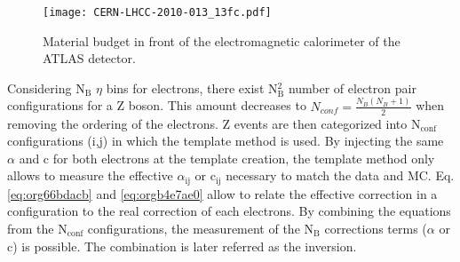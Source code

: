 \begin{figure}[htbp]
\centering
\texttt{[image: CERN-LHCC-2010-013\_13fc.pdf]}
\caption{\label{fig:org37061bb}
Material budget in front of the electromagnetic calorimeter of the ATLAS detector.\cite{CERN-LHCC-2010-013}}
\end{figure}


\begin{table}
\caption{Absolute values of $\eta_{calo}$ bin edges for energy scale factors (black and brown) and resolution constant terms (brown) for run~2.}
\label{tab:Calibration_inSitu_binning}
\end{table}


Considering N\(_{\text{B}}\) $\eta$ bins for electrons, there exist N\(_{\text{B}}^{\text{2}}\) number of electron pair configurations for a Z boson.
This amount decreases to \(N_{conf}=\frac{N_B(N_B+1)}{2}\) when removing the ordering of the electrons.
Z events are then categorized into  N\(_{\text{conf}}\) configurations (i,j) in which the template method is used.
By injecting the same \(\alpha\) and c for both electrons at the template creation, the template method only allows to measure the effective \(\alpha_{\text{ij}}\) or c\(_{\text{ij}}\) necessary to match the data and MC.
Eq. \ref{eq:org66bdacb} and \ref{eq:orgb4e7ae0} allow to relate the effective correction in a configuration to the real correction of each electrons.
By combining the equations from the N\(_{\text{conf}}\) configurations, the measurement of the N\(_{\text{B}}\) corrections terms (\(\alpha\) or c) is possible.
The combination is later referred as the inversion.



